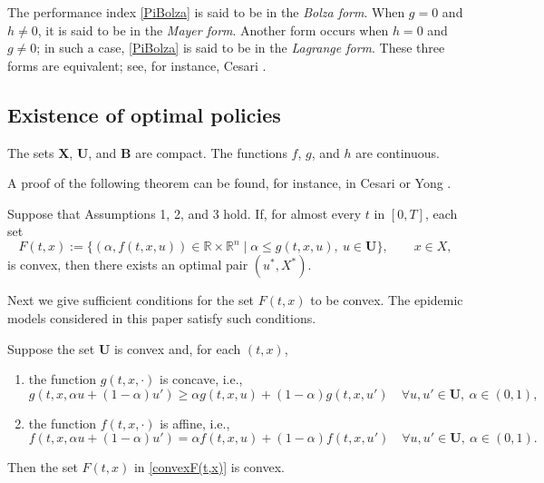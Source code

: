 \begin{remark}\rm
The performance index \eqref{PiBolza} is said to be in the {\it Bolza form}. When $g= 0$ and $h\neq 0$, it is said to be in the {\it Mayer form}. Another form occurs when $h= 0$ and $g\neq 0$; in such a case, \eqref{PiBolza} is said to be in the {\it Lagrange form}. These three forms are equivalent; see, for instance, Cesari \cite[Sect. 1.9]{Cesari83}. 
\end{remark} 


\subsection{Existence of optimal policies}

\begin{assumption}\rm The sets $\mathbf{X}$,  $\mathbf{U}$, and $\mathbf{B}$ are compact. The functions $f$, $g$, and $h$ are continuous.
\end{assumption}
A proof of the following theorem can be found, for instance, in Cesari \cite[Sect. 9.3.]{Cesari83} or Yong \cite[Theorem 2.2.1]{Yong2015}. 
\begin{theorem}[Filippov] Suppose that Assumptions 1, 2, and 3 hold. If, for almost every $t$ in $[0,T]$, each set
        \begin{equation}\label{convexF(t,x)}
F(t,x):= \{ (\alpha, f(t,x,u))\in \mathbb{R}\times \mathbb{R}^n\mid  
    \alpha \leq g(t,x,u), \  u\in \mathbf{U}\},\qquad x\in X,
        \end{equation}
is convex, then there exists an optimal pair $(u^\ast,X^\ast)$.
\end{theorem} 
Next we give sufficient conditions for the set $F(t,x)$ to be convex. The epidemic models considered in this paper satisfy such conditions.

\begin{remark}\rm Suppose the set $\mathbf{U}$ is convex and, for each $(t,x)$, 
\begin{enumerate}[\rm (a)]
    \item the function $g(t,x,\cdot)$ is concave, i.e.,
        \[ g(t,x,\alpha u+(1-\alpha)u') \geq \alpha g(t,x,u) +(1-\alpha) g(t,x,u') \quad \forall u,u'\in\mathbf{U},\  \alpha\in (0,1), \]
       
    \item the function $f(t,x,\cdot)$ is affine, i.e., 
      \[ f(t,x,\alpha u+(1-\alpha)u') = \alpha f(t,x,u) +(1-\alpha) f(t,x,u') \quad \forall  u,u'\in\mathbf{U},\   \alpha\in (0,1). \]
\end{enumerate} 
Then the set $F(t,x)$ in \eqref{convexF(t,x)} is convex.
\end{remark}








